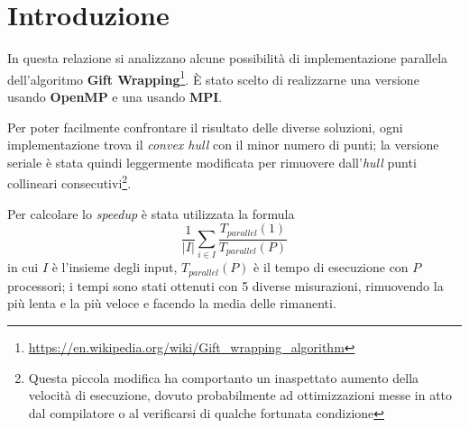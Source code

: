 \section{Introduzione}
In questa relazione si analizzano alcune possibilità di implementazione parallela dell'algoritmo \textbf{Gift Wrapping}\footnote{\url{https://en.wikipedia.org/wiki/Gift_wrapping_algorithm}}.
È stato scelto di realizzarne una versione usando \textbf{OpenMP} e una usando \textbf{MPI}.

Per poter facilmente confrontare il risultato delle diverse soluzioni, ogni implementazione trova il \emph{convex hull} con il minor numero di punti;
la versione seriale è stata quindi leggermente modificata per rimuovere dall'\emph{hull} punti collineari consecutivi\footnote{Questa piccola modifica ha comportanto un inaspettato aumento della velocità di esecuzione, dovuto probabilmente ad ottimizzazioni messe in atto dal compilatore o al verificarsi di qualche fortunata condizione}.
 
Per calcolare lo \emph{speedup} è stata utilizzata la formula
\begin{equation}
    \frac{1}{|I|} \sum_{i \in I}{} \frac{T_{parallel}(1)}{T_{parallel}(P)}
\end{equation}
in cui $I$ è l'insieme degli input, $T_{parallel}(P)$ è il tempo di esecuzione con $P$ processori; i tempi sono stati ottenuti con 5 diverse misurazioni,
rimuovendo la più lenta e la più veloce e facendo la media delle rimanenti.
